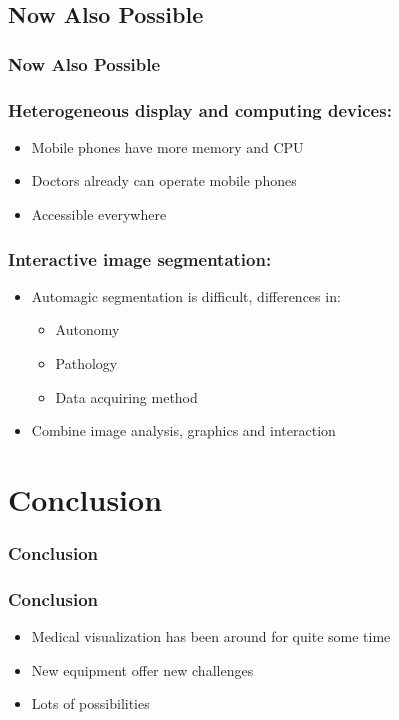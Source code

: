 \documentclass{beamer}
\begin{document}
\subsection{Now Also Possible}
\begin{frame}
	\frametitle{Now Also Possible}
\end{frame}

\begin{frame}
	\frametitle{Heterogeneous display and computing devices:}
	\begin{itemize}
		\item Mobile phones have more memory and CPU
		\item Doctors already can operate mobile phones
		\item Accessible everywhere
	\end{itemize}
\end{frame}

\begin{frame}
	\frametitle{Interactive image segmentation:}
	\begin{itemize}
		\item Automagic segmentation is difficult, differences in:
			\begin{itemize}
				\item Autonomy
				\item Pathology
				\item Data acquiring method
			\end{itemize}
		\item Combine image analysis, graphics and interaction
	\end{itemize}
\end{frame}

\section{Conclusion}
\begin{frame}
	\frametitle{Conclusion}
\end{frame}

\begin{frame}
	\frametitle{Conclusion}
	\begin{itemize}
		\item Medical visualization has been around for quite some time
		\item New equipment offer new challenges
		\item Lots of possibilities
	\end{itemize}
\end{frame}
\end{document}
